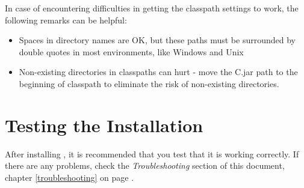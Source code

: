 In case of encountering difficulties in getting the classpath settings
to work, the following remarks can be helpful:
\begin{itemize}
\item Spaces in directory names are OK, but these paths must be
  surrounded by double quotes in most environments, like Windows and
  Unix
\item Non-existing directories in classpaths can hurt - move the
  \nr{}C.jar path to the beginning of classpath to eliminate the
  risk of non-existing directories.
\end{itemize}

\section{Testing the \nr{} Installation}\label{testing}
After installing \nr{}, it is recommended that you test that it is
working correctly. If there are any problems, check the
\emph{Troubleshooting} section of this document, chapter
\ref{troubleshooting} on page \pageref{troubleshooting}.

